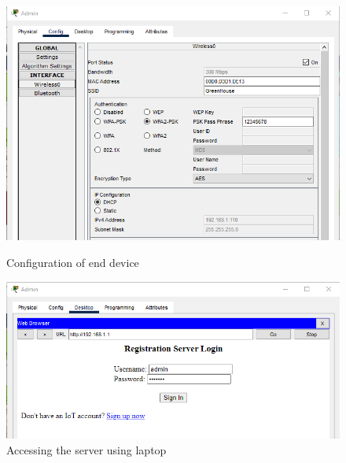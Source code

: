 \documentclass{report}
\begin{document}
\begin{figure}[h]
    \centering
    
    \begin{minipage}{0.45\textwidth}
    \centering
    \includegraphics[width=1\textwidth]{As/1a.png}
    \caption{Configuration of end device}
    \label{fig:8}
    \end{minipage}
    \hfill
    \begin{minipage}{0.45\textwidth}
    \centering
    \includegraphics[width=1\textwidth]{As/2a.png}
    \caption{Accessing the server using laptop}
    \label{fig:9}
    \end{minipage} 

\end{figure}
\newpage
\end{document}
